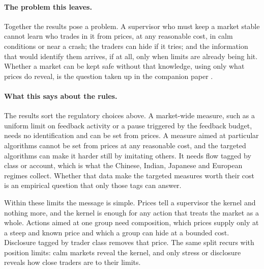 \paragraph{The problem this leaves.} Together the results pose a problem. A supervisor who must keep a market stable cannot learn who trades in it from prices, at any reasonable cost, in calm conditions or near a crash; the traders can hide if it tries; and the information that would identify them arrives, if at all, only when limits are already being hit. Whether a market can be kept safe without that knowledge, using only what prices do reveal, is the question taken up in the companion paper \citep{niroula2026b}.

\paragraph{What this says about the rules.} The results sort the regulatory choices above. A market-wide measure, such as a uniform limit on feedback activity or a pause triggered by the feedback budget, needs no identification and can be set from prices. A measure aimed at particular algorithms cannot be set from prices at any reasonable cost, and the targeted algorithms can make it harder still by imitating others. It needs flow tagged by class or account, which is what the Chinese, Indian, Japanese and European regimes collect. Whether that data make the targeted measures worth their cost is an empirical question that only those tags can answer.

Within these limits the message is simple. Prices tell a supervisor the kernel and nothing more, and the kernel is enough for any action that treats the market as a whole. Actions aimed at one group need composition, which prices supply only at a steep and known price and which a group can hide at a bounded cost. Disclosure tagged by trader class removes that price. The same split recurs with position limits: calm markets reveal the kernel, and only stress or disclosure reveals how close traders are to their limits.
